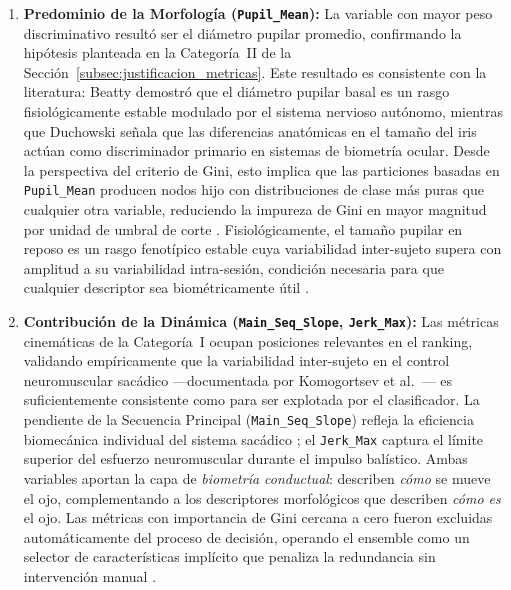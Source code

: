 \begin{enumerate}
	
	\item \textbf{Predominio de la Morfología (\texttt{Pupil\_Mean}):}
	La variable con mayor peso discriminativo resultó ser el diámetro
	pupilar promedio, confirmando la hipótesis planteada en la
	Categoría~II de la Sección~\ref{subsec:justificacion_metricas}.
	Este resultado es consistente con la literatura: Beatty
	\cite{beatty1982} demostró que el diámetro pupilar basal es un
	rasgo fisiológicamente estable modulado por el sistema nervioso
	autónomo, mientras que Duchowski \cite{duchowski2017} señala que
	las diferencias anatómicas en el tamaño del iris actúan como
	discriminador primario en sistemas de biometría ocular.
	Desde la
	perspectiva del criterio de Gini, esto implica que las particiones
	basadas en \texttt{Pupil\_Mean} producen nodos hijo con
	distribuciones de clase más puras que cualquier otra variable,
	reduciendo la impureza de Gini en mayor magnitud por unidad de
	umbral de corte \cite{breiman2001}.
	Fisiológicamente, el tamaño
	pupilar en reposo es un rasgo fenotípico estable cuya variabilidad
	inter-sujeto supera con amplitud a su variabilidad intra-sesión,
	condición necesaria para que cualquier descriptor sea biométricamente
	útil \cite{komogortsev2010}.
	\item \textbf{Contribución de la Dinámica
		(\texttt{Main\_Seq\_Slope}, \texttt{Jerk\_Max}):}
	Las métricas cinemáticas de la Categoría~I ocupan posiciones
	relevantes en el ranking, validando empíricamente que la
	variabilidad inter-sujeto en el control neuromuscular sacádico
	---documentada por Komogortsev et al.\ \cite{komogortsev2010}---
	es suficientemente consistente como para ser explotada por el
	clasificador.
	La pendiente de la Secuencia Principal
	(\texttt{Main\_Seq\_Slope}) refleja la eficiencia biomecánica
	individual del sistema sacádico \cite{bahill1975};
	el
	\texttt{Jerk\_Max} captura el límite superior del esfuerzo
	neuromuscular durante el impulso balístico.
	Ambas variables
	aportan la capa de \textit{biometría conductual}: describen
	\textit{cómo} se mueve el ojo, complementando a los descriptores
	morfológicos que describen \textit{cómo es} el ojo.
	Las métricas
	con importancia de Gini cercana a cero fueron excluidas
	automáticamente del proceso de decisión, operando el ensemble
	como un selector de características implícito que penaliza la
	redundancia sin intervención manual \cite{breiman2001}.
\end{enumerate}

